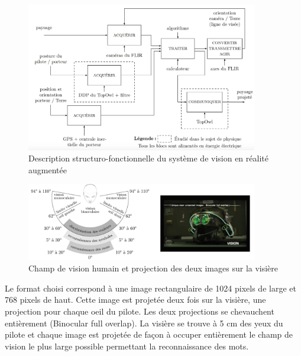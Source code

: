 \begin{figure}[!htb]
\begin{center}
\includegraphics[width=0.9\textwidth]{images/chaine_fonctionnelle3.jpg}
\caption{Description structuro-fonctionnelle du système de vision en réalité augmentée \label{chaine_fonctionnelle}}
\end{center}
\end{figure}


\begin{figure}[!htb]
\begin{center}
\includegraphics[width=0.9\textwidth]{images/figure6.jpg}
\caption{Champ de vision humain et projection des deux images sur la visière \label{figure6}}
\end{center}
\end{figure}

Le format choisi correspond à une image rectangulaire de 1024 pixels de large et 768 pixels de haut. Cette image
est projetée deux fois sur la visière, une projection pour chaque oeil du pilote. Les deux projections se chevauchent
entièrement (Binocular full overlap). La visière se trouve à 5 cm des yeux du pilote et chaque image est projetée
de façon à occuper entièrement le champ de vision le plus large possible permettant la reconnaissance des mots.

